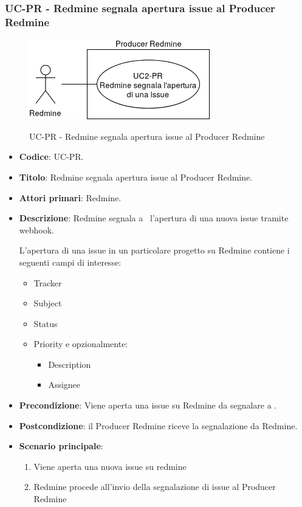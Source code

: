 \subsubsection{UC\theuccount-PR - Redmine segnala apertura issue al Producer Redmine}
    \begin{figure}[H]
		\centering
		\includegraphics[width=0.7\textwidth]{img/casi_d'uso/UC2.png}\\
		\caption{UC\theuccount-PR - Redmine segnala apertura issue al Producer Redmine}
	\end{figure}
	\begin{itemize}
		\item \textbf{Codice}: UC\theuccount-PR.
		\item \textbf{Titolo}: Redmine segnala apertura issue al Producer Redmine.
		\item \textbf{Attori primari}: Redmine.
		\item \textbf{Descrizione}: Redmine segnala a \progetto\ l'apertura di una nuova issue tramite webhook.
		
		L'apertura di una issue in un particolare progetto su Redmine contiene i seguenti campi di interesse:
		 \begin{itemize}
		 	\item Tracker
		 	\item Subject
		 	\item Status
		 	\item Priority e opzionalmente:
		 	\begin{itemize}
		 		\item Description
		 		\item Assignee
		 	\end{itemize}
		 \end{itemize}
		\item \textbf{Precondizione}: Viene aperta una issue su Redmine da
		segnalare a \progetto.
		\item \textbf{Postcondizione}: il Producer Redmine riceve la segnalazione da Redmine.
		\item \textbf{Scenario principale}: 
		\begin{enumerate}
			\item Viene aperta una nuova issue su redmine
			\item Redmine procede all'invio della segnalazione di issue al Producer Redmine
		\end{enumerate}
		
	\end{itemize}
